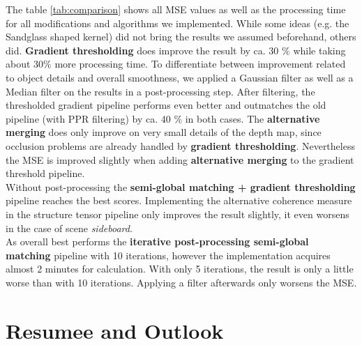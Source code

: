 \documentclass  [
  paper    = a4,
  BCOR     = 10mm,
  twoside,
  fontsize = 12pt,
  fleqn,
  toc      = bibnumbered,
  toc      = listofnumbered,
  numbers  = noendperiod,
  headings = normal,
  listof   = leveldown,
  version  = 3.03
]                                       {scrreprt}
\begin{document}
The table \ref{tab:comparison}  shows all MSE values as well as the processing time for all modifications and algorithms we implemented. While some ideas (e.g. the Sandglass shaped kernel) did not bring the results we assumed beforehand, others did. \textbf{ Gradient thresholding} does improve the result by ca. 30 $\%$ while taking about 30$\%$ more processing time. To differentiate between improvement related to object details and overall smoothness, we applied a Gaussian filter as well as a Median filter on the results in a post-processing step. After filtering, the thresholded gradient pipeline performs even better and outmatches the old pipeline (with PPR filtering) by ca. 40 $\%$ in both cases. The \textbf{alternative merging} does only improve on very small details of the depth map, since occlusion problems are already handled by \textbf{ gradient thresholding}. Nevertheless the MSE is improved slightly when adding \textbf{alternative merging} to the gradient threshold pipeline.\\
Without post-processing the \textbf{semi-global matching + gradient thresholding} pipeline reaches the best scores. Implementing the alternative coherence measure in the structure tensor pipeline only improves the result slightly, it even worsens in the case of scene \textit{sideboard}.\\
As overall best performs the \textbf{iterative post-processing semi-global matching} pipeline with 10 iterations, however the implementation acquires almost 2 minutes for calculation. With only 5 iterations, the result is only a little worse than with 10 iterations. Applying a filter afterwards only worsens the MSE.

\chapter{Resumee and Outlook}
\end{document}
